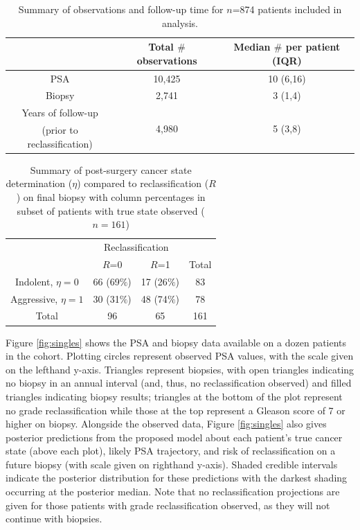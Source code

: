 \documentclass[12pt, letterpaper]{article}
\begin{document}
\begin{table}
\begin{center}
\begin{tabular}{|c|c|c|}
\hline
 & Total $\#$ observations & Median $\#$ per patient (IQR) \\[5pt]
\hline
PSA & 10,425 & 10 (6,16)\\[5pt]
Biopsy & 2,741 & 3 (1,4)\\[5pt]
Years of follow-up & \multirow{2}{*}{4,980} & \multirow{2}{*}{5 (3,8)}\\
(prior to reclassification) & & \\[5pt]
\hline
\end{tabular}
\caption{Summary of observations and follow-up time for $n$=874 patients included in analysis.}
\label{tab:num_obs}
\end{center}
\end{table}

\begin{table}
\begin{center}
\begin{tabular}{|c|c|c|c|}
\hline
& \multicolumn{2}{|c|}{Reclassification} & \\
 & $R$=0 & $R$=1 & Total\\[5pt]
 \hline
Indolent, $\eta=0$ & 66  (69$\%$) & 17 (26$\%$) & 83 \\[5pt]
Aggressive, $\eta=1$ & 30 (31$\%$) & 48 (74$\%$) & 78\\[5pt]
 \hline 
 Total & 96 & 65 & 161\\[5pt]
\hline
\end{tabular}
\caption{Summary of post-surgery cancer state determination ($\eta$) compared to reclassification ($R$) on final biopsy with column percentages in subset of patients with true state observed ($n=161$)}
\label{tab:eta-vs-rc}
\end{center}
\end{table}


Figure \ref{fig:singles} shows the PSA and biopsy data available on a dozen patients in the cohort.  Plotting circles represent observed PSA values, with the scale given on the lefthand y-axis. Triangles represent biopsies, with open triangles indicating no biopsy in an annual interval (and, thus, no reclassification observed) and filled triangles indicating biopsy results; triangles at the bottom of the plot represent no grade reclassification while those at the top represent a Gleason score of 7 or higher on biopsy. Alongside the observed data, Figure \ref{fig:singles} also gives posterior predictions from the proposed model about each patient's true cancer state (above each plot), likely PSA trajectory, and risk of reclassification on a future biopsy (with scale given on righthand y-axis). Shaded credible intervals indicate the posterior distribution for these predictions with the darkest shading occurring at the posterior median. Note that no reclassification projections are given for those patients with grade reclassification observed, as they will not continue with biopsies.  
\end{document}
